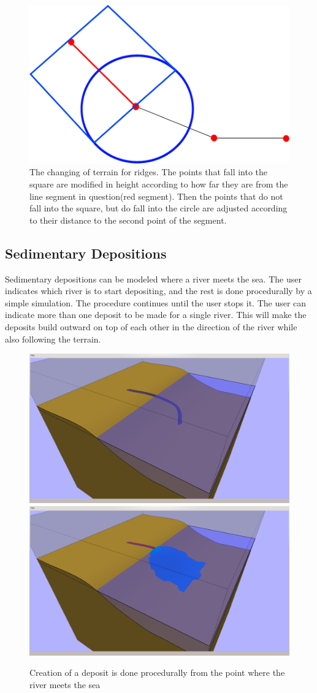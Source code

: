 \documentclass[a4paper,12pt]{report}
\begin{document}
\begin{figure}
\centering
\includegraphics[width=.7\linewidth]{thesis/ridgeTerrain.pdf}
 \caption{The changing of terrain for ridges. The points that fall into the square are modified in height according to how far they are from the line segment in question(red segment). Then the points that do not fall into the square, but do fall into the circle are adjusted according to their distance to the second point of the segment.}
 \label{fig:ridgeTerrain}
\end{figure}


\subsection{Sedimentary Depositions}
Sedimentary depositions can be modeled where a river meets the sea. The user indicates which river is to start depositing, and the rest is done procedurally by a simple simulation. The procedure continues until the user stops it. The user can indicate more than one deposit to be made for a single river. This will make the deposits build outward on top of each other in the direction of the river while also following the terrain.

\begin{figure}
\includegraphics[trim = 90mm 7mm 80mm 30mm, clip,width=.5\linewidth]{thesis/results/depositBefore.png}
\includegraphics[trim = 90mm 7mm 80mm 30mm, clip,width=.5\linewidth]{thesis/results/depositCreated.png}
 \caption{Creation of a deposit is done procedurally from the point where the river meets the sea}
 \label{fig:depositCreate}
\end{figure}
\end{document}
